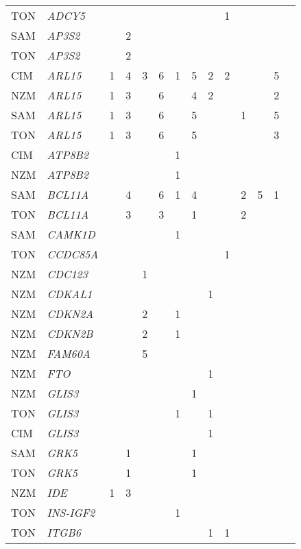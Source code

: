 \documentclass[]{report}
\begin{document}
\begin{ThreePartTable}
\begin{longtable}[t]{llllllllllllll}
TON & \em{ADCY5} &  &  &  &  &  &  &  & 1 &  &  &  & \\
SAM & \em{AP3S2} &  & 2 &  &  &  &  &  &  &  &  &  & \\
TON & \em{AP3S2} &  & 2 &  &  &  &  &  &  &  &  &  & \\
CIM & \em{ARL15} & 1 & 4 & 3 & 6 & 1 & 5 & 2 & 2 &  &  & 5 & \\
NZM & \em{ARL15} & 1 & 3 &  & 6 &  & 4 & 2 &  &  &  & 2 & \\
SAM & \em{ARL15} & 1 & 3 &  & 6 &  & 5 &  &  & 1 &  & 5 & \\
TON & \em{ARL15} & 1 & 3 &  & 6 &  & 5 &  &  &  &  & 3 & \\
CIM & \em{ATP8B2} &  &  &  &  & 1 &  &  &  &  &  &  & \\
NZM & \em{ATP8B2} &  &  &  &  & 1 &  &  &  &  &  &  & \\
SAM & \em{BCL11A} &  & 4 &  & 6 & 1 & 4 &  &  & 2 & 5 & 1 & \\
TON & \em{BCL11A} &  & 3 &  & 3 &  & 1 &  &  & 2 &  &  & \\
SAM & \em{CAMK1D} &  &  &  &  & 1 &  &  &  &  &  &  & \\
TON & \em{CCDC85A} &  &  &  &  &  &  &  & 1 &  &  &  & \\
NZM & \em{CDC123} &  &  & 1 &  &  &  &  &  &  &  &  & \\
NZM & \em{CDKAL1} &  &  &  &  &  &  & 1 &  &  &  &  & \\
NZM & \em{CDKN2A} &  &  & 2 &  & 1 &  &  &  &  &  &  & \\
NZM & \em{CDKN2B} &  &  & 2 &  & 1 &  &  &  &  &  &  & \\
NZM & \em{FAM60A} &  &  & 5 &  &  &  &  &  &  &  &  & \\
NZM & \em{FTO} &  &  &  &  &  &  & 1 &  &  &  &  & \\
NZM & \em{GLIS3} &  &  &  &  &  & 1 &  &  &  &  &  & \\
TON & \em{GLIS3} &  &  &  &  & 1 &  & 1 &  &  &  &  & \\
CIM & \em{GLIS3} &  &  &  &  &  &  & 1 &  &  &  &  & \\
SAM & \em{GRK5} &  & 1 &  &  &  & 1 &  &  &  &  &  & \\
TON & \em{GRK5} &  & 1 &  &  &  & 1 &  &  &  &  &  & \\
NZM & \em{IDE} & 1 & 3 &  &  &  &  &  &  &  &  &  & \\
TON & \em{INS-IGF2} &  &  &  &  & 1 &  &  &  &  &  &  & \\
TON & \em{ITGB6} &  &  &  &  &  &  & 1 & 1 &  &  &  & \\

\end{longtable}
\end{ThreePartTable}
\end{document}
